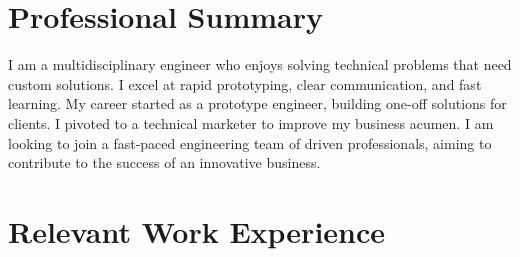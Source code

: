 \documentclass[
	10pt, %
]{FreemanCV}
\begin{document}
\vspace{-35pt}

\section {Professional Summary}
I am a multidisciplinary engineer who enjoys solving technical problems that need custom solutions.
I excel at rapid prototyping, clear communication, and fast learning.
My career started as a prototype engineer, building one-off solutions for clients.
I pivoted to a technical marketer to improve my business acumen.
I am looking to join a fast-paced engineering team of driven professionals, aiming to contribute to the success of an innovative business.

\section{Relevant Work Experience}




\end{document}
